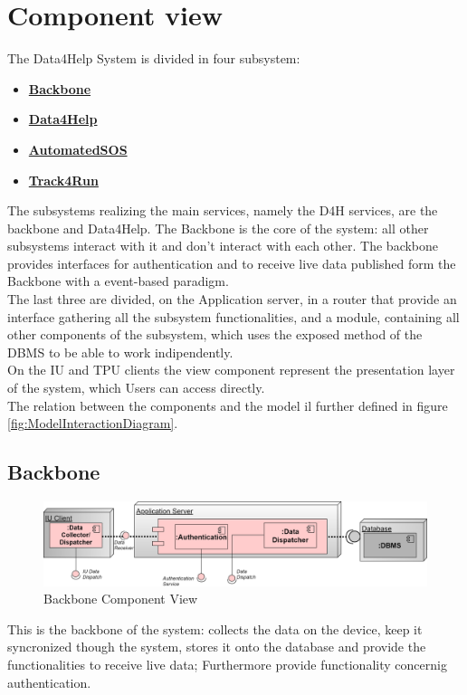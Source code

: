 \section{Component view}
\label{sect:ComponetView}
The Data4Help System is divided in four subsystem:
\begin{itemize}
\item \textbf{\hyperref[subsect:backboneComponentView]{Backbone}}
\item \textbf{\hyperref[subsect:D4HComponentView]{Data4Help}}
\item \textbf{\hyperref[subsect:ASOSComponentView]{AutomatedSOS}}
\item \textbf{\hyperref[subsect:T4RComponentView]{Track4Run}}
\end{itemize}
The subsystems realizing the main services, namely the D4H services, are the backbone and Data4Help.
The Backbone is the core of the system: all other subsystems interact with it and don't interact with each other. The backbone provides interfaces for authentication and to receive live data published form the Backbone with a event-based paradigm.\\
The last three are divided, on the Application server, in a router that provide an interface gathering all the subsystem functionalities, and a module, containing all other components of the subsystem, which uses the exposed method of the DBMS to be able to work indipendently. \\
On the IU and TPU clients the view component represent the presentation layer of the system, which Users can access directly.\\
The relation between the components and the model il further defined in figure \ref{fig:ModelInteractionDiagram}.
\subsection{Backbone}
\label{subsect:backboneComponentView}
\begin{figure}[H]
\caption{Backbone Component View}
\includegraphics[width = \textwidth]{sections/architecturalDesign/BackboneDiagram.png}
\end{figure}
This is the backbone of the system: collects the data on the device, keep it syncronized though the system, stores it onto the database and provide the functionalities to receive live data; Furthermore provide functionality concernig authentication.
